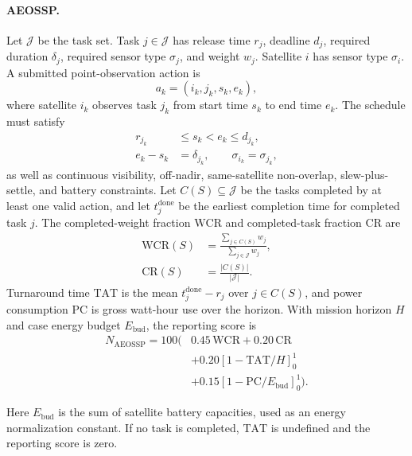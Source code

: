 \documentclass[11pt]{article}
\begin{document}
\paragraph{AEOSSP.} Let \(\mathcal{J}\) be the task set. Task \(j\in\mathcal{J}\) has release time \(r_j\), deadline \(d_j\), required duration \(\delta_j\), required sensor type \(\sigma_j\), and weight \(w_j\). Satellite \(i\) has sensor type \(\sigma_i\). A submitted point-observation action is
\[
  a_k=(i_k,j_k,s_k,e_k),
\]
where satellite \(i_k\) observes task \(j_k\) from start time \(s_k\) to end time \(e_k\). The schedule must satisfy
\[
  \begin{aligned}
  r_{j_k}&\le s_k<e_k\le d_{j_k},\\
  e_k-s_k&=\delta_{j_k},\qquad \sigma_{i_k}=\sigma_{j_k},
  \end{aligned}
\]
as well as continuous visibility, off-nadir, same-satellite non-overlap, slew-plus-settle, and battery constraints. Let \(C(S)\subseteq\mathcal{J}\) be the tasks completed by at least one valid action, and let \(t^{\mathrm{done}}_j\) be the earliest completion time for completed task \(j\). The completed-weight fraction \(\mathrm{WCR}\) and completed-task fraction \(\mathrm{CR}\) are
\[
  \begin{aligned}
  \mathrm{WCR}(S)&=\frac{\sum_{j\in C(S)}w_j}{\sum_{j\in\mathcal{J}} w_j},\\
  \mathrm{CR}(S)&=\frac{|C(S)|}{|\mathcal{J}|}.
  \end{aligned}
\]
Turnaround time \(\mathrm{TAT}\) is the mean \(t^{\mathrm{done}}_j-r_j\) over \(j\in C(S)\), and power consumption \(\mathrm{PC}\) is gross watt-hour use over the horizon. With mission horizon \(H\) and case energy budget \(E_{\mathrm{bud}}\), the reporting score is
\[
  \begin{aligned}
  N_{\mathrm{AEOSSP}}=100(&0.45\,\mathrm{WCR}+0.20\,\mathrm{CR}\\
  &+0.20[1-\mathrm{TAT}/H]_0^1\\
  &+0.15[1-\mathrm{PC}/E_{\mathrm{bud}}]_0^1).
  \end{aligned}
\]

Here \(E_{\mathrm{bud}}\) is the sum of satellite battery capacities, used as an energy normalization constant. If no task is completed, \(\mathrm{TAT}\) is undefined and the reporting score is zero.
\end{document}
